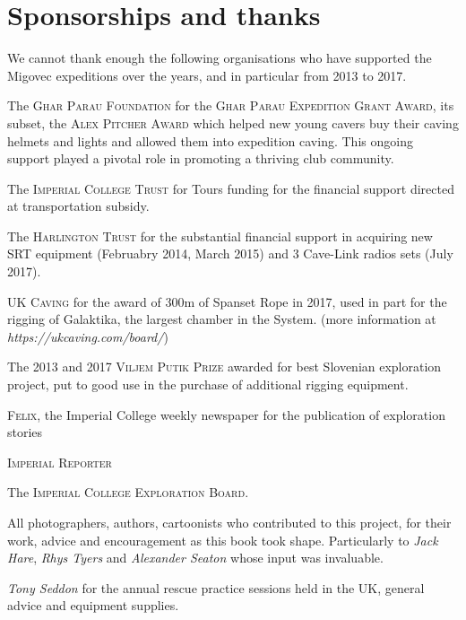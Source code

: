 \chapter{Sponsorships and thanks}
We cannot thank enough the following organisations who have supported the Migovec expeditions over the years, and in particular from 2013 to 2017.
\begin{citemize}
\item The \textsc{Ghar Parau Foundation} for  the \textsc{Ghar Parau Expedition Grant Award}, its subset, the \textsc{Alex Pitcher Award} which helped new young cavers buy their caving helmets and lights and allowed them into expedition caving. This ongoing support played a pivotal role in promoting a thriving club community.

\item The \textsc{Imperial College Trust} for Tours funding for the financial support directed at transportation subsidy.
\item The \textsc{Harlington Trust} for the substantial financial support in acquiring new SRT equipment (Februabry 2014, March 2015) and 3 Cave-Link radios sets (July 2017).
\item \textsc{UK Caving} for the award of 300m of Spanset Rope in 2017, used  in part for the rigging of Galaktika, the largest chamber in the System. (more information at \emph{https://ukcaving.com/board/})
\item The \textsc{2013} and \textsc{2017 Viljem Putik Prize} awarded for best Slovenian exploration project, put to good use in the purchase of additional rigging equipment.
\item \textsc{Felix}, the Imperial College weekly newspaper for the publication of exploration stories
\item \textsc{Imperial Reporter}
\item The \textsc{Imperial College Exploration Board}.

\mydelimiter

\item All photographers, authors, cartoonists who contributed to this project, for their work, advice and encouragement as this book took shape. Particularly to \emph{Jack Hare}, \emph{Rhys Tyers} and \emph{Alexander Seaton} whose input was invaluable. 

\item \emph{Tony Seddon} for the annual rescue practice sessions held in the UK, general advice and equipment supplies.


\end{citemize}
